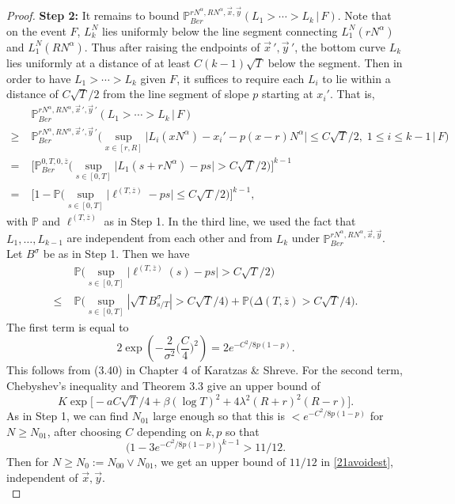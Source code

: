 \documentclass[12pt]{article}
\begin{document}
\begin{proof}
	\noindent\textbf{Step 2:} It remains to bound $\mathbb{P}^{rN^\alpha, RN^\alpha,\vec{x},\vec{y}}_{Ber} (L_1 > \cdots > L_k\,|\,F)$. Note that on the event $F$, $L_k^N$ lies uniformly below the line segment connecting $L_1^N(rN^\alpha)$ and $L_1^N(RN^\alpha)$. Thus after raising the endpoints of $\vec{x}\,',\vec{y}\,'$, the bottom curve $L_k$ lies uniformly at a distance of at least $C(k-1)\sqrt{T}$ below the segment. Then in order to have $L_1 > \cdots > L_k$ given $F$, it suffices to require each $L_i$ to lie within a distance of $C\sqrt{T}/2$ from  the line segment of slope $p$ starting at $x_i'$. That is,
	\begin{align}
	&\mathbb{P}^{rN^\alpha, RN^\alpha,\vec{x}\,',\vec{y}\,'}_{Ber} (L_1 > \cdots > L_k\,|\,F) \nonumber\\
	\geq \; & \mathbb{P}^{rN^\alpha, RN^\alpha,\vec{x}\,',\vec{y}\,'}_{Ber} \Big(\sup_{x\in[r,R]} \big|L_i(xN^\alpha) - x_i' - p(x-r)N^\alpha\big| \leq C\sqrt{T}/2, \;1\leq i\leq k-1\,\Big|\,F\Big) \nonumber\\
	= \; & \Big[ \mathbb{P}^{0,T,0,\overline{z}}_{Ber} \Big(\sup_{s\in[0,T]} \big|L_1(s+rN^\alpha) - ps\big| > C\sqrt{T}/2\Big)\Big]^{k-1} \nonumber\\
	= \; & \Big[ 1 - \mathbb{P}\Big(\sup_{s\in[0,T]} \big|\ell^{(T,\overline{z})} - ps\big| \leq C\sqrt{T}/2\Big)\Big]^{k-1}, \label{21avoidest}
	\end{align}
	with $\mathbb{P}$ and $\ell^{(T,\overline{z})}$ as in Step 1. In the third line, we used the fact that $L_1,\dots,L_{k-1}$ are independent from each other and from $L_k$ under $\mathbb{P}^{rN^\alpha, RN^\alpha,\vec{x},\vec{y}}_{Ber}$. Let $B^\sigma$ be as in Step 1. Then we have
	\begin{align*}
	&\mathbb{P} \Big(\sup_{s\in[0,T]} \big|\ell^{(T,\overline{z})}(s) - ps\big| > C\sqrt{T}/2\Big)\\
	\leq \; & \mathbb{P}\Big(\sup_{s\in[0,T]} |\sqrt{T}B^{\sigma}_{s/T}| > C\sqrt{T}/4\Big) + \mathbb{P}\Big(\Delta(T,\overline{z}) > C\sqrt{T}/4\Big).
	\end{align*}
	The first term is equal to
	\[
	2\exp\left(-\frac{2}{\sigma^2}\Big(\frac{C}{4}\Big)^2\right) = 2e^{-C^2/8p(1-p)}.
	\]
	This follows from (3.40) in Chapter 4 of Karatzas \& Shreve. For the second term, Chebyshev's inequality and Theorem 3.3 give an upper bound of
	\[
	K\exp\Big[-aC\sqrt{T}/4 + \beta(\log T)^2 + 4\lambda^2(R+r)^2(R-r) \Big].
	\]
	As in Step 1, we can find $N_{01}$ large enough so that this is $<e^{-C^2/8p(1-p)}$ for $N\geq N_{01}$, after choosing $C$ depending on $k,p$ so that
	\begin{equation}
	\big(1-3e^{-C^2/8p(1-p)}\big)^{k-1} > 11/12. \label{21Cineq}
	\end{equation}
	Then for $N\geq N_0 := N_{00} \vee N_{01}$, we get an upper bound of $11/12$ in \eqref{21avoidest}, independent of $\vec{x},\vec{y}$.\\
	

\end{proof}
\end{document}
